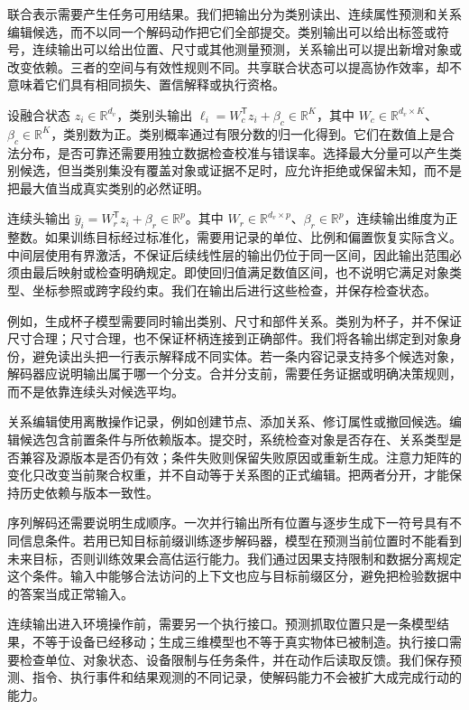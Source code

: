 联合表示需要产生任务可用结果。我们把输出分为类别读出、连续属性预测和关系编辑候选，而不以同一个解码动作把它们全部提交。类别输出可以给出标签或符号，连续输出可以给出位置、尺寸或其他测量预测，关系输出可以提出新增对象或改变依赖。三者的空间与有效性规则不同。共享联合状态可以提高协作效率，却不意味着它们具有相同损失、置信解释或执行资格。

设融合状态 $z_i\in\mathbb R^{d_v}$，类别头输出 $\ell_i=W_c^{\mathsf T}z_i+\beta_c\in\mathbb R^K$，其中 $W_c\in\mathbb R^{d_v\times K}$、$\beta_c\in\mathbb R^K$，类别数为正。类别概率通过有限分数的归一化得到。它们在数值上是合法分布，是否可靠还需要用独立数据检查校准与错误率。选择最大分量可以产生类别候选，但当类别集没有覆盖对象或证据不足时，应允许拒绝或保留未知，而不是把最大值当成真实类别的必然证明。

连续头输出 $\widehat y_i=W_r^{\mathsf T}z_i+\beta_r\in\mathbb R^p$。其中 $W_r\in\mathbb R^{d_v\times p}$、$\beta_r\in\mathbb R^p$，连续输出维度为正整数。如果训练目标经过标准化，需要用记录的单位、比例和偏置恢复实际含义。中间层使用有界激活，不保证后续线性层的输出仍位于同一区间，因此输出范围必须由最后映射或检查明确规定。即使回归值满足数值区间，也不说明它满足对象类型、坐标参照或跨字段约束。我们在输出后进行这些检查，并保存检查状态。

例如，生成杯子模型需要同时输出类别、尺寸和部件关系。类别为杯子，并不保证尺寸合理；尺寸合理，也不保证杯柄连接到正确部件。我们将各输出绑定到对象身份，避免读出头把一行表示解释成不同实体。若一条内容记录支持多个候选对象，解码器应说明输出属于哪一个分支。合并分支前，需要任务证据或明确决策规则，而不是依靠连续头对候选平均。

关系编辑使用离散操作记录，例如创建节点、添加关系、修订属性或撤回候选。编辑候选包含前置条件与所依赖版本。提交时，系统检查对象是否存在、关系类型是否兼容及源版本是否仍有效；条件失败则保留失败原因或重新生成。注意力矩阵的变化只改变当前聚合权重，并不自动等于关系图的正式编辑。把两者分开，才能保持历史依赖与版本一致性。

序列解码还需要说明生成顺序。一次并行输出所有位置与逐步生成下一符号具有不同信息条件。若用已知目标前缀训练逐步解码器，模型在预测当前位置时不能看到未来目标，否则训练效果会高估运行能力。我们通过因果支持限制和数据分离规定这个条件。输入中能够合法访问的上下文也应与目标前缀区分，避免把检验数据中的答案当成正常输入。

连续输出进入环境操作前，需要另一个执行接口。预测抓取位置只是一条模型结果，不等于设备已经移动；生成三维模型也不等于真实物体已被制造。执行接口需要检查单位、对象状态、设备限制与任务条件，并在动作后读取反馈。我们保存预测、指令、执行事件和结果观测的不同记录，使解码能力不会被扩大成完成行动的能力。


